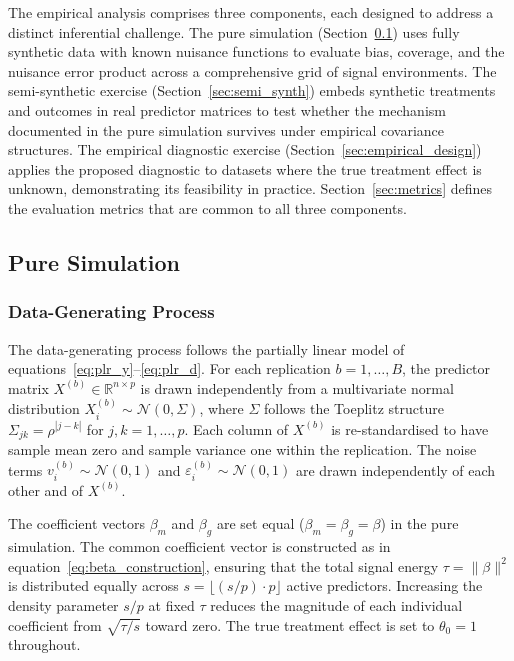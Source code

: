 \documentclass[a4paper,10.5pt]{article}
\begin{document}
The empirical analysis comprises three components, each designed to address a distinct inferential challenge. The pure simulation (Section~\ref{sec:pure_sim}) uses fully synthetic data with known nuisance functions to evaluate bias, coverage, and the nuisance error product across a comprehensive grid of signal environments. The semi-synthetic exercise (Section~\ref{sec:semi_synth}) embeds synthetic treatments and outcomes in real predictor matrices to test whether the mechanism documented in the pure simulation survives under empirical covariance structures. The empirical diagnostic exercise (Section~\ref{sec:empirical_design}) applies the proposed diagnostic to datasets where the true treatment effect is unknown, demonstrating its feasibility in practice. Section~\ref{sec:metrics} defines the evaluation metrics that are common to all three components.


\subsection{Pure Simulation}\label{sec:pure_sim}

\subsubsection*{Data-Generating Process}

The data-generating process follows the partially linear model of equations~\eqref{eq:plr_y}--\eqref{eq:plr_d}. For each replication $b = 1, \ldots, B$, the predictor matrix $X^{(b)} \in \mathbb{R}^{n \times p}$ is drawn independently from a multivariate normal distribution $X^{(b)}_i \sim \mathcal{N}(0, \Sigma)$, where $\Sigma$ follows the Toeplitz structure $\Sigma_{jk} = \rho^{|j-k|}$ for $j, k = 1, \ldots, p$. Each column of $X^{(b)}$ is re-standardised to have sample mean zero and sample variance one within the replication. The noise terms $v^{(b)}_i \sim \mathcal{N}(0,1)$ and $\varepsilon^{(b)}_i \sim \mathcal{N}(0,1)$ are drawn independently of each other and of $X^{(b)}$.

The coefficient vectors $\beta_m$ and $\beta_g$ are set equal ($\beta_m = \beta_g = \beta$) in the pure simulation. The common coefficient vector is constructed as in equation~\eqref{eq:beta_construction}, ensuring that the total signal energy $\tau = \|\beta\|^2$ is distributed equally across $s = \lfloor (s/p) \cdot p \rfloor$ active predictors. Increasing the density parameter $s/p$ at fixed $\tau$ reduces the magnitude of each individual coefficient from $\sqrt{\tau/s}$ toward zero. The true treatment effect is set to $\theta_0 = 1$ throughout.
\end{document}
